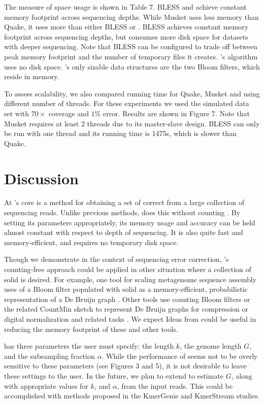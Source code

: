 \documentclass{bmcart}
\begin{document}
The measure of space usage is shown in Table 7. BLESS and \tool achieve constant memory footprint across sequencing depths.  While Musket uses less memory than Quake, it uses more than either BLESS or \tool.  BLESS achieves constant memory footprint across sequencing depths, but consumes more disk space for datasets with deeper sequencing.  Note that BLESS can be configured to trade off between peak memory footprint and the number of temporary files it creates.  \tool's algorithm uses no disk space.  \tool's only sizable data structures are the two Bloom filters, which reside in memory.

To assess scalability, we also compared running time for Quake, Musket and \tool using different number of threads.  For these experiments we used the simulated \ecoli data set with $70\times$ coverage and $1\%$ error.  Results are shown in Figure 7.  Note that Musket requires at least 2 threads due to its master-slave design.  BLESS can only be run with one thread and its running time is 1475s, which is slower than Quake.


\section*{Discussion}
At \tool's core is a method for obtaining a set of correct \kmers from a large collection of sequencing reads.
Unlike previous methods, \tool does this without counting \kmers.
By setting its parameters appropriately, its memory usage and accuracy can be held almost constant with respect to depth of sequencing.
It is also quite fast and memory-efficient, and requires no temporary disk space.

Though we demonstrate \tool in the context of sequencing error correction, \tool's counting-free approach could be applied in other situation where a collection of solid \kmers is desired.
For example, one tool for scaling metagenome sequence assembly uses of a Bloom filter populated with solid \kmers as a memory-efficient, probabilistic representation of a De Bruijn graph \cite{pell2012scaling}.
Other tools use counting Bloom filters \cite{fan2000summary, bonomi2006improved} or the related CountMin sketch \cite{cormode2005improved} to represent De Bruijn graphs for compression \cite{jones2012compression} or digital normalization and related tasks \cite{zhang2013these}.
We expect Ideas from \tool could be useful in reducing the memory footprint of these and other tools. 

\tool has three parameters the user must specify: the \kmer length $k$, the genome length $G$, and the subsampling fraction $\alpha$.
While the performance of \tool seems not to be overly sensitive to these parameters (see Figures 3 and 5), it is not desirable to leave these settings to the user.
In the future, we plan to extend \tool to estimate $G$, along with appropriate values for $k$, and $\alpha$, from the input reads.
This could be accomplished with methods proposed in the KmerGenie \cite{chikhi2014informed} and KmerStream \cite{melsted2014kmerstream} studies.
\end{document}
